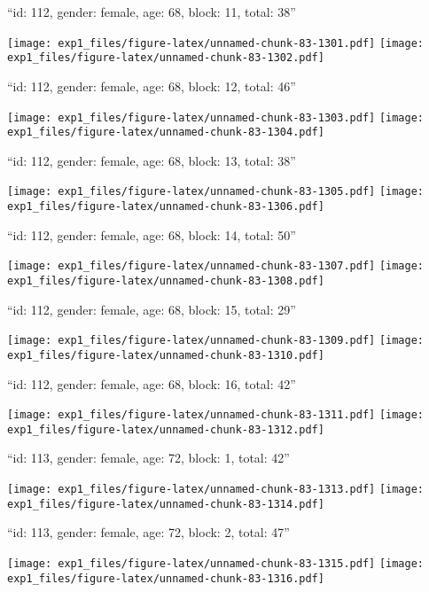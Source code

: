 \documentclass[11pt,,]{article}
\begin{document}
\newpage
[1] 

``id: 112, gender: female, age: 68, block: 11, total: 38''

\texttt{[image: exp1\_files/figure-latex/unnamed-chunk-83-1301.pdf]}
\texttt{[image: exp1\_files/figure-latex/unnamed-chunk-83-1302.pdf]}

\newpage
[1] 

``id: 112, gender: female, age: 68, block: 12, total: 46''

\texttt{[image: exp1\_files/figure-latex/unnamed-chunk-83-1303.pdf]}
\texttt{[image: exp1\_files/figure-latex/unnamed-chunk-83-1304.pdf]}

\newpage
[1] 

``id: 112, gender: female, age: 68, block: 13, total: 38''

\texttt{[image: exp1\_files/figure-latex/unnamed-chunk-83-1305.pdf]}
\texttt{[image: exp1\_files/figure-latex/unnamed-chunk-83-1306.pdf]}

\newpage
[1] 

``id: 112, gender: female, age: 68, block: 14, total: 50''

\texttt{[image: exp1\_files/figure-latex/unnamed-chunk-83-1307.pdf]}
\texttt{[image: exp1\_files/figure-latex/unnamed-chunk-83-1308.pdf]}

\newpage
[1] 

``id: 112, gender: female, age: 68, block: 15, total: 29''

\texttt{[image: exp1\_files/figure-latex/unnamed-chunk-83-1309.pdf]}
\texttt{[image: exp1\_files/figure-latex/unnamed-chunk-83-1310.pdf]}

\newpage
[1] 

``id: 112, gender: female, age: 68, block: 16, total: 42''

\texttt{[image: exp1\_files/figure-latex/unnamed-chunk-83-1311.pdf]}
\texttt{[image: exp1\_files/figure-latex/unnamed-chunk-83-1312.pdf]}

\newpage
[1] 

``id: 113, gender: female, age: 72, block: 1, total: 42''

\texttt{[image: exp1\_files/figure-latex/unnamed-chunk-83-1313.pdf]}
\texttt{[image: exp1\_files/figure-latex/unnamed-chunk-83-1314.pdf]}

\newpage
[1] 

``id: 113, gender: female, age: 72, block: 2, total: 47''

\texttt{[image: exp1\_files/figure-latex/unnamed-chunk-83-1315.pdf]}
\texttt{[image: exp1\_files/figure-latex/unnamed-chunk-83-1316.pdf]}
\end{document}
